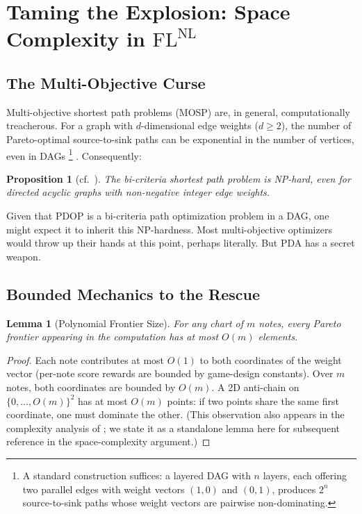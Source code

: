 \documentclass[11pt, letterpaper]{article}
\newtheorem{lemma}[theorem]{Lemma}
\newtheorem{proposition}[theorem]{Proposition}
\theoremstyle{definition}
\theoremstyle{remark}
\begin{document}
\section{Taming the Explosion: Space Complexity in $\mathrm{FL^{NL}}$}
\label{sec:space}

\subsection{The Multi-Objective Curse}

Multi-objective shortest path problems (MOSP) are, in general, computationally treacherous.
For a graph with $d$-dimensional edge weights ($d \ge 2$), the number of Pareto-optimal source-to-sink paths can be exponential in the number of vertices, even in DAGs \footnote{A standard construction suffices: a layered DAG with $n$ layers, each offering two parallel edges with weight vectors $(1,0)$ and $(0,1)$, produces $2^n$ source-to-sink paths whose weight vectors are pairwise non-dominating.} \cite{Hansen1980}.
Consequently:

\begin{proposition}[{cf.\ \cite{Hansen1980, Serafini1986}}]
\label{prop:mosp-hard}
The bi-criteria shortest path problem is NP-hard, even for directed acyclic graphs with non-negative integer edge weights.
\end{proposition}

Given that PDOP is a bi-criteria path optimization problem in a DAG, one might expect it to inherit this NP-hardness.
Most multi-objective optimizers would throw up their hands at this point, perhaps literally.
But PDA has a secret weapon.

\subsection{Bounded Mechanics to the Rescue}

\begin{lemma}[Polynomial Frontier Size]
\label{lemma:bounded-frontier}
For any chart of $m$ notes, every Pareto frontier appearing in the computation has at most $O(m)$ elements.
\end{lemma}

\begin{proof}
Each note contributes at most $O(1)$ to both coordinates of the weight vector (per-note score rewards are bounded by game-design constants).
Over $m$ notes, both coordinates are bounded by $O(m)$.
A 2D anti-chain on $\{0, \ldots, O(m)\}^2$ has at most $O(m)$ points: if two points share the same first coordinate, one must dominate the other.
(This observation also appears in the complexity analysis of \cite[\S4.2, \S4.4]{Chang2026}; we state it as a standalone lemma here for subsequent reference in the space-complexity argument.)
\end{proof}
\end{document}
